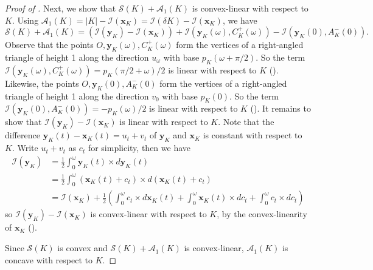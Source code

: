 \begin{proof}[Proof of ]
Next, we show that \(\mathcal{S}(K) + \mathcal{A}_1(K)\) is convex-linear with respect to \(K\). Using \(\mathcal{A}_1(K) = |K| - \mathcal{I}(\mathbf{x}_K) = \mathcal{I}(\delta K) - \mathcal{I}(\mathbf{x}_K)\), we have
\[
\mathcal{S}(K) + \mathcal{A}_1(K) = \left( \mathcal{I}(\mathbf{y}_K) - \mathcal{I}(\mathbf{x}_K) \right) + \mathcal{I}(\mathbf{y}_K(\omega), C_K^+(\omega)) - \mathcal{I}(\mathbf{y}_K(0), A_K^-(0)).
\]
Observe that the points \(O, \mathbf{y}_K(\omega), C_K^+(\omega)\) form the vertices of a right-angled triangle of height 1 along the direction \(u_\omega\) with base \(p_K(\omega + \pi/2)\). So the term \(\mathcal{I}(\mathbf{y}_K(\omega), C_K^+(\omega)) = p_K(\pi/2 + \omega) / 2\) is linear with respect to \(K\) (). Likewise, the points \(O, \mathbf{y}_K(0), A_K^-(0)\) form the vertices of a right-angled triangle of height 1 along the direction \(v_0\) with base \(p_K(0)\). So the term \(\mathcal{I}(\mathbf{y}_K(0), A_K^-(0)) = -p_K(\omega)/2\) is linear with respect to \(K\) (). It remains to show that \(\mathcal{I}(\mathbf{y}_K) - \mathcal{I}(\mathbf{x}_K)\) is linear with respect to \(K\). Note that the difference \(\mathbf{y}_K(t) - \mathbf{x}_K(t) = u_t + v_t\) of \(\mathbf{y}_K\) and \(\mathbf{x}_K\) is constant with respect to \(K\). Write \(u_t + v_t\) as \(c_t\) for simplicity, then we have
\[
\begin{split}
\mathcal{I}(\mathbf{y}_K) & = \frac{1}{2} \int_{0}^\omega \mathbf{y}_K(t) \times d \mathbf{y}_K(t) \\
& = \frac{1}{2} \int_{0}^\omega (\mathbf{x}_K(t) + c_t) \times d (\mathbf{x}_K(t) + c_t)  \\
& = \mathcal{I}(\mathbf{x}_K) + \frac{1}{2} \left( \int_{0}^\omega c_t \times d \mathbf{x}_K(t) 
+ \int_{0}^\omega \mathbf{x}_K(t) \times d c_t + \int_{0}^\omega c_t \times d c_t \right) 
\end{split}
\]
so \(\mathcal{I}(\mathbf{y}_K) - \mathcal{I}(\mathbf{x}_K)\) is convex-linear with respect to \(K\), by the convex-linearity of \(\mathbf{x}_K\) ().

Since \(\mathcal{S}(K)\) is convex and \(\mathcal{S}(K) + \mathcal{A}_1(K)\) is convex-linear, \(\mathcal{A}_1(K)\) is concave with respect to \(K\).
\end{proof}